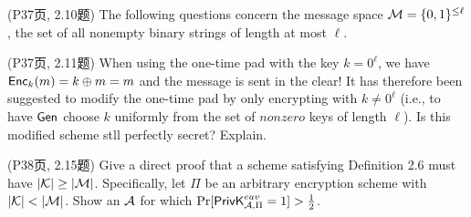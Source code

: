 \begin{questions}
\begin{parts}
            \begin{solution}
            \end{solution}

        \end{parts}

    \question (P37页, 2.10题) The following questions concern the message space $\mathcal{M}=\{0,1\}^{\le \ell}$, the set of all nonempty binary strings of length at most $\ell$.

    \question (P37页, 2.11题) When using the one-time pad with the key $k=0^\ell$, we have $\mathsf{Enc}_k(m)=k \oplus m = m$ and the message is sent in the clear! It has therefore been suggested to modify the one-time pad by only encrypting with $k \neq 0^\ell$ (i.e., to have $\mathsf{Gen}$ choose $k$ uniformly from the set of $nonzero$ keys of length $\ell$). Is this modified scheme stll perfectly secret? Explain.

        \begin{solution}
        \end{solution}

    \question (P38页, 2.15题) Give a direct proof that a scheme satisfying Definition 2.6 must have $|\mathcal{K}|\ge |\mathcal{M}|$. Specifically, let $\Pi$ be an arbitrary encryption scheme with $|\mathcal{K}| < |\mathcal{M}|$. Show an $\mathcal{A}$ for which $\Pr[\mathsf{PrivK}^{eav}_{\mathcal{A},\Pi}=1]>\frac{1}{2}$.\\


\end{questions}

